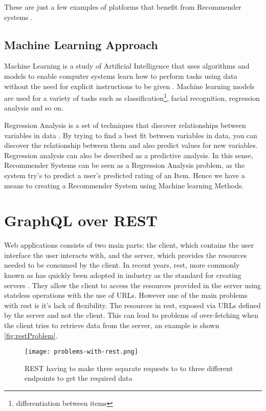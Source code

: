 These are just a few examples of platforms that benefit from Recommender systems \cite{polatidis2013recommender}.

\subsection{Machine Learning Approach} \label{subsec:mlApproach}
Machine Learning is a study of Artificial Intelligence that uses algorithms and models to enable computer systems learn how to perform tasks using data without the need for explicit instructions to be given \cite{michie1994machine}. Machine learning models are used for a variety of tasks such as classification\footnote{differentiation between items}, facial recognition, regression analysis and so on.

Regression Analysis is a set of techniques that discover relationships between variables in data \cite{chatterjee2015regression}. By trying to find a best fit between variables in data, you can discover the relationship between them and also predict values for new variables. Regression analysis can also be described as a predictive analysis. In this sense, Recommender Systems can be seen as a Regression Analysis problem, as the system try's to predict a user's predicted rating of an Item. Hence we have a means to creating a Recommender System using Machine learning Methods.

\section{GraphQL over REST}
Web applications consists of two main parts: the client, which contains the user interface the user interacts with, and the server, which provides the resources needed to be consumed by the client. In recent years, \acrfull{rest}, more commonly known as  has quickly been adopted in industry as the standard for creating servers \cite{guy2015rest}. They allow the client to access the resources provided in the server using stateless operations with the use of URLs. However one of the main problems with \acrshort{rest} is it's lack of flexibility. The resources in \acrshort{rest}, exposed via URLs defined by the server and not the client. This can lead to problems of over-fetching when the client tries to retrieve data from the server, an example is shown \autoref{fig:restProblem}.

\begin{figure}[htb!]
    \centering
    \texttt{[image: problems-with-rest.png]}
    \caption{REST having to make three separate requests to to three different endpoints to get the required data \cite{graphqlvsRest}}
    \label{fig:restProblem}
\end{figure}

